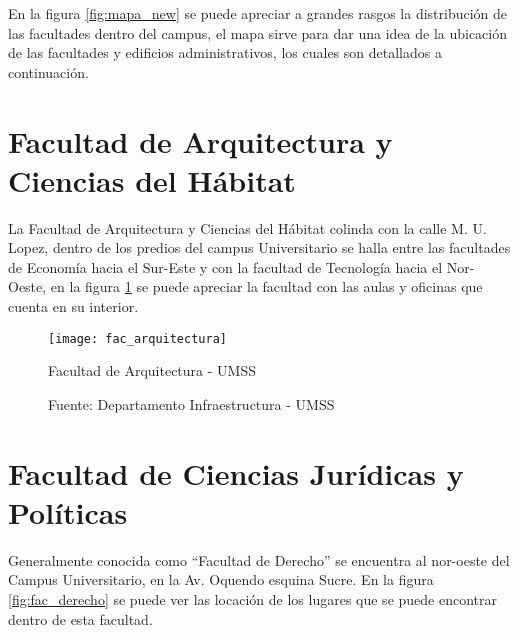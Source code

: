 En la figura \ref{fig:mapa_new} se puede apreciar a grandes rasgos la distribución de las facultades dentro del campus, el mapa sirve para dar una idea de la ubicación de las facultades y edificios administrativos, los cuales son detallados a continuación.

\section{Facultad de Arquitectura y Ciencias del Hábitat}
\label{sec:facultad_arquitectura}

    La Facultad de Arquitectura y Ciencias del Hábitat colinda con la calle M. U. Lopez, dentro de los predios del campus Universitario se halla entre las facultades de Economía hacia el Sur-Este y con la facultad de Tecnología hacia el Nor-Oeste, en la figura \ref{fig:fac_arqui} se puede apreciar la facultad con las aulas y oficinas que cuenta en su interior.

    \begin{figure}[H]
     \begin{center}
       \texttt{[image: fac\_arquitectura]}
       \caption{Facultad de Arquitectura - UMSS}
       \label{fig:fac_arqui}
       \caption*{Fuente: Departamento Infraestructura - UMSS}
     \end{center}
    \end{figure}




 \section{Facultad de Ciencias Jurídicas y Políticas}
 \label{sec:facultad_derecho}


 Generalmente conocida como ``Facultad de Derecho'' se encuentra al nor-oeste del Campus Universitario, en la Av. Oquendo esquina Sucre. En la figura \ref{fig:fac_derecho} se puede ver las locación de los lugares que se puede encontrar dentro de esta facultad.

